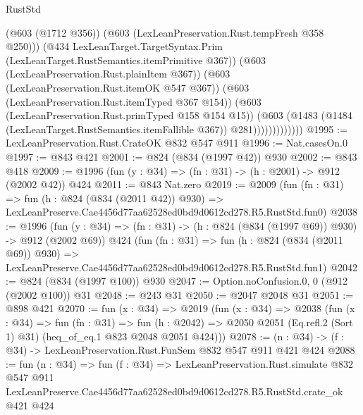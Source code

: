 \begin{lexlean}{RustStd}
\begin{coremodule}
                            (@603 (@1712 @356))
                            (@603 (LexLeanPreservation.Rust.tempFresh @358 @250)))
                          (@434
                            LexLeanTarget.TargetSyntax.Prim
                            (LexLeanTarget.RustSemantics.itemPrimitive @367))
                          (@603 (LexLeanPreservation.Rust.plainItem @367))
                          (@603 (LexLeanPreservation.Rust.itemOK @547 @367))
                          (@603 (LexLeanPreservation.Rust.itemTyped @367 @154))
                          (@603 (LexLeanPreservation.Rust.primTyped @158 @154 @15))
                          (@603
                            (@1483
                              (@1484 (LexLeanTarget.RustSemantics.itemFallible @367))
                              @281)))))))))))))
@1995 := LexLeanPreservation.Rust.CrateOK @832 @547 @911
@1996 := Nat.casesOn.{0}
@1997 := @843 @421
@2001 := @824 (@834 (@1997 @42)) @930
@2002 := @843 @418
@2009 := @1996 (fun (y : @34) => (fn : @31) -> (h : @2001) -> @912 (@2002 @42)) @424
@2011 := @843 Nat.zero
@2019 := @2009
    (fun (fn : @31) =>
    fun (h : @824 (@834 (@2011 @42)) @930) =>
    LexLeanPreserve.Cae4456d77aa62528ed0bd9d0612cd278.R5.RustStd.fun0)
@2038 := @1996
    (fun (y : @34) => (fn : @31) -> (h : @824 (@834 (@1997 @69)) @930) -> @912 (@2002 @69))
    @424
    (fun (fn : @31) =>
    fun (h : @824 (@834 (@2011 @69)) @930) =>
    LexLeanPreserve.Cae4456d77aa62528ed0bd9d0612cd278.R5.RustStd.fun1)
@2042 := @824 (@834 (@1997 @100)) @930
@2047 := Option.noConfusion.{0, 0} (@912 (@2002 @100)) @31
@2048 := @243 @31
@2050 := @2047 @2048 @31
@2051 := @898 @421
@2070 := fun (x : @34) =>
  @2019
    (fun (x : @34) =>
    @2038
      (fun (x : @34) =>
      fun (fn : @31) =>
      fun (h : @2042) =>
      @2050 @2051 (Eq.refl.{2} (Sort 1) @31) (heq_of_eq.{1} @823 @2048 @2051 @424)))
@2078 := (n : @34) -> (f : @34) -> LexLeanPreservation.Rust.FunSem @832 @547 @911 @421 @424
@2088 := fun (n : @34) =>
  fun (f : @34) =>
  LexLeanPreservation.Rust.simulate
    @832
    @547
    @911
    LexLeanPreserve.Cae4456d77aa62528ed0bd9d0612cd278.R5.RustStd.crate_ok
    @421
    @424
\end{coremodule}
\end{lexlean}
